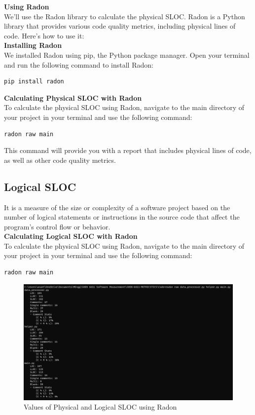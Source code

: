 \documentclass[runningheads]{llncs}
\begin{document}
\textbf{Using Radon}\\
We'll use the Radon library to calculate the physical SLOC. Radon is a Python library that provides various code quality metrics, including physical lines of code. Here's how to use it:\\

\textbf{Installing Radon}\\
We  installed Radon using pip, the Python package manager. Open your terminal and run the following command to install Radon:

\begin{verbatim}
pip install radon
\end{verbatim}

\textbf{Calculating Physical SLOC with Radon}\\
To calculate the physical SLOC using Radon, navigate to the main directory of your project in your terminal and use the following command:

\begin{verbatim}
radon raw main
\end{verbatim}

This command will provide you with a report that includes physical lines of code, as well as other code quality metrics.

\subsection{Logical SLOC}
It is a measure of the size or complexity of a software project based on the number of logical statements or instructions in the source code that affect the program’s control flow or behavior.\\

\textbf{Calculating Logical SLOC with Radon}\\
To calculate the physical SLOC using Radon, navigate to the main directory of your project in your terminal and use the following command:

\begin{verbatim}
radon raw main
\end{verbatim}

\begin{figure}[h]
  \centering
  \includegraphics[width=14cm]{LOC.png}
  \caption{Values of Physical and Logical SLOC using Radon}
\end{figure}
\end{document}
